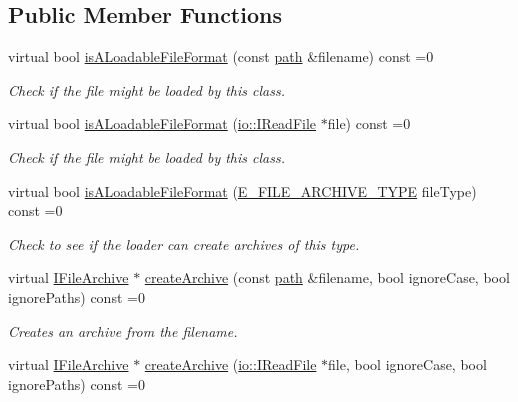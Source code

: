 \subsection*{Public Member Functions}
\begin{DoxyCompactItemize}
\item 
virtual bool \hyperlink{classirr_1_1io_1_1IArchiveLoader_a9835ccbfd2c261edf4a738421c488ce3}{is\+A\+Loadable\+File\+Format} (const \hyperlink{namespaceirr_1_1io_a6468281622ce3a1c46b72e19f32dded5}{path} \&filename) const =0
\begin{DoxyCompactList}\small\item\em Check if the file might be loaded by this class. \end{DoxyCompactList}\item 
virtual bool \hyperlink{classirr_1_1io_1_1IArchiveLoader_acda22c3c2a5268665a4a4cf17379931b}{is\+A\+Loadable\+File\+Format} (\hyperlink{classirr_1_1io_1_1IReadFile}{io\+::\+I\+Read\+File} $\ast$file) const =0
\begin{DoxyCompactList}\small\item\em Check if the file might be loaded by this class. \end{DoxyCompactList}\item 
virtual bool \hyperlink{classirr_1_1io_1_1IArchiveLoader_af60c081f27ab941702a4a32dfe482c05}{is\+A\+Loadable\+File\+Format} (\hyperlink{namespaceirr_1_1io_adb3e3c445ec8e608ed1f0f93306da14f}{E\+\_\+\+F\+I\+L\+E\+\_\+\+A\+R\+C\+H\+I\+V\+E\+\_\+\+T\+Y\+PE} file\+Type) const =0
\begin{DoxyCompactList}\small\item\em Check to see if the loader can create archives of this type. \end{DoxyCompactList}\item 
virtual \hyperlink{classirr_1_1io_1_1IFileArchive}{I\+File\+Archive} $\ast$ \hyperlink{classirr_1_1io_1_1IArchiveLoader_a55e9586f190588e5fea6d17f63fb7aad}{create\+Archive} (const \hyperlink{namespaceirr_1_1io_a6468281622ce3a1c46b72e19f32dded5}{path} \&filename, bool ignore\+Case, bool ignore\+Paths) const =0
\begin{DoxyCompactList}\small\item\em Creates an archive from the filename. \end{DoxyCompactList}\item 
virtual \hyperlink{classirr_1_1io_1_1IFileArchive}{I\+File\+Archive} $\ast$ \hyperlink{classirr_1_1io_1_1IArchiveLoader_acd4a78189c62db96e4e10aa89c934980}{create\+Archive} (\hyperlink{classirr_1_1io_1_1IReadFile}{io\+::\+I\+Read\+File} $\ast$file, bool ignore\+Case, bool ignore\+Paths) const =0

\end{DoxyCompactItemize}

